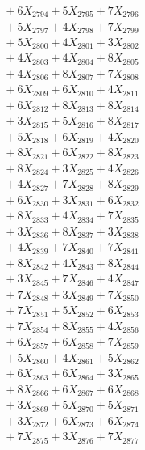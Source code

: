 \documentclass[a4paper,10pt]{article}
\begin{document}
{\begin{align}
&\;  + 6 X_{2794} + 5 X_{2795} + 7 X_{2796} \\[0.3ex]
&\;  + 5 X_{2797} + 4 X_{2798} + 7 X_{2799} \\[0.5ex]\allowbreak
&\;  + 5 X_{2800} + 4 X_{2801} + 3 X_{2802} \\[0.3ex]
&\;  + 4 X_{2803} + 4 X_{2804} + 8 X_{2805} \\[0.3ex]
&\;  + 4 X_{2806} + 8 X_{2807} + 7 X_{2808} \\[0.3ex]
&\;  + 6 X_{2809} + 6 X_{2810} + 4 X_{2811} \\[0.3ex]
&\;  + 6 X_{2812} + 8 X_{2813} + 8 X_{2814} \\[0.3ex]
&\;  + 3 X_{2815} + 5 X_{2816} + 8 X_{2817} \\[0.3ex]
&\;  + 5 X_{2818} + 6 X_{2819} + 4 X_{2820} \\[0.3ex]
&\;  + 8 X_{2821} + 6 X_{2822} + 8 X_{2823} \\[0.3ex]
&\;  + 8 X_{2824} + 3 X_{2825} + 4 X_{2826} \\[0.3ex]
&\;  + 4 X_{2827} + 7 X_{2828} + 8 X_{2829} \\[0.5ex]\allowbreak
&\;  + 6 X_{2830} + 3 X_{2831} + 6 X_{2832} \\[0.3ex]
&\;  + 8 X_{2833} + 4 X_{2834} + 7 X_{2835} \\[0.3ex]
&\;  + 3 X_{2836} + 8 X_{2837} + 3 X_{2838} \\[0.3ex]
&\;  + 4 X_{2839} + 7 X_{2840} + 7 X_{2841} \\[0.3ex]
&\;  + 8 X_{2842} + 4 X_{2843} + 8 X_{2844} \\[0.3ex]
&\;  + 3 X_{2845} + 7 X_{2846} + 4 X_{2847} \\[0.3ex]
&\;  + 7 X_{2848} + 3 X_{2849} + 7 X_{2850} \\[0.3ex]
&\;  + 7 X_{2851} + 5 X_{2852} + 6 X_{2853} \\[0.3ex]
&\;  + 7 X_{2854} + 8 X_{2855} + 4 X_{2856} \\[0.3ex]
&\;  + 6 X_{2857} + 6 X_{2858} + 7 X_{2859} \\[0.5ex]\allowbreak
&\;  + 5 X_{2860} + 4 X_{2861} + 5 X_{2862} \\[0.3ex]
&\;  + 6 X_{2863} + 6 X_{2864} + 3 X_{2865} \\[0.3ex]
&\;  + 8 X_{2866} + 6 X_{2867} + 6 X_{2868} \\[0.3ex]
&\;  + 3 X_{2869} + 5 X_{2870} + 5 X_{2871} \\[0.3ex]
&\;  + 3 X_{2872} + 6 X_{2873} + 6 X_{2874} \\[0.3ex]
&\;  + 7 X_{2875} + 3 X_{2876} + 7 X_{2877} \\[0.3ex]

\end{align}}
\end{document}
